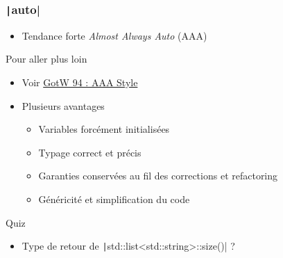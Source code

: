 \documentclass[C++.tex]{subfiles}
\begin{document}
\begin{frame}[fragile]
	\frametitle{\texttt|auto|}
	\begin{itemize}
		\item Tendance forte \textit{Almost Always Auto} (AAA)
	\end{itemize}

	\begin{block}{Pour aller plus loin}
		\begin{itemize}
			\item Voir \href{https://herbsutter.com/2013/08/12/gotw-94-solution-aaa-style-almost-always-auto/}{GotW 94 : AAA Style\linklogo}
		\end{itemize}
	\end{block}

	\begin{itemize}
		\item Plusieurs avantages
		\begin{itemize}
			\item Variables forcément initialisées
			\item Typage correct et précis
			\item Garanties conservées au fil des corrections et refactoring
			\item Généricité et simplification du code
		\end{itemize}
	\end{itemize}

	\pause

	\begin{block}{Quiz}
		\begin{itemize}
			\item Type de retour de \texttt|std::list<std::string>::size()| ?
		\end{itemize}
	\end{block}
\end{frame}
\end{document}
